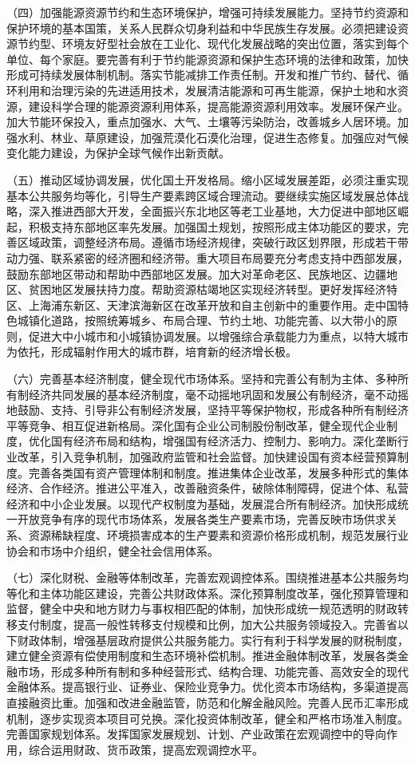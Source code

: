 （四）加强能源资源节约和生态环境保护，增强可持续发展能力。坚持节约资源和保护环境的基本国策，关系人民群众切身利益和中华民族生存发展。必须把建设资源节约型、环境友好型社会放在工业化、现代化发展战略的突出位置，落实到每个单位、每个家庭。要完善有利于节约能源资源和保护生态环境的法律和政策，加快形成可持续发展体制机制。落实节能减排工作责任制。开发和推广节约、替代、循环利用和治理污染的先进适用技术，发展清洁能源和可再生能源，保护土地和水资源，建设科学合理的能源资源利用体系，提高能源资源利用效率。发展环保产业。加大节能环保投入，重点加强水、大气、土壤等污染防治，改善城乡人居环境。加强水利、林业、草原建设，加强荒漠化石漠化治理，促进生态修复。加强应对气候变化能力建设，为保护全球气候作出新贡献。

（五）推动区域协调发展，优化国土开发格局。缩小区域发展差距，必须注重实现基本公共服务均等化，引导生产要素跨区域合理流动。要继续实施区域发展总体战略，深入推进西部大开发，全面振兴东北地区等老工业基地，大力促进中部地区崛起，积极支持东部地区率先发展。加强国土规划，按照形成主体功能区的要求，完善区域政策，调整经济布局。遵循市场经济规律，突破行政区划界限，形成若干带动力强、联系紧密的经济圈和经济带。重大项目布局要充分考虑支持中西部发展，鼓励东部地区带动和帮助中西部地区发展。加大对革命老区、民族地区、边疆地区、贫困地区发展扶持力度。帮助资源枯竭地区实现经济转型。更好发挥经济特区、上海浦东新区、天津滨海新区在改革开放和自主创新中的重要作用。走中国特色城镇化道路，按照统筹城乡、布局合理、节约土地、功能完善、以大带小的原则，促进大中小城市和小城镇协调发展。以增强综合承载能力为重点，以特大城市为依托，形成辐射作用大的城市群，培育新的经济增长极。

（六）完善基本经济制度，健全现代市场体系。坚持和完善公有制为主体、多种所有制经济共同发展的基本经济制度，毫不动摇地巩固和发展公有制经济，毫不动摇地鼓励、支持、引导非公有制经济发展，坚持平等保护物权，形成各种所有制经济平等竞争、相互促进新格局。深化国有企业公司制股份制改革，健全现代企业制度，优化国有经济布局和结构，增强国有经济活力、控制力、影响力。深化垄断行业改革，引入竞争机制，加强政府监管和社会监督。加快建设国有资本经营预算制度。完善各类国有资产管理体制和制度。推进集体企业改革，发展多种形式的集体经济、合作经济。推进公平准入，改善融资条件，破除体制障碍，促进个体、私营经济和中小企业发展。以现代产权制度为基础，发展混合所有制经济。加快形成统一开放竞争有序的现代市场体系，发展各类生产要素市场，完善反映市场供求关系、资源稀缺程度、环境损害成本的生产要素和资源价格形成机制，规范发展行业协会和市场中介组织，健全社会信用体系。

（七）深化财税、金融等体制改革，完善宏观调控体系。围绕推进基本公共服务均等化和主体功能区建设，完善公共财政体系。深化预算制度改革，强化预算管理和监督，健全中央和地方财力与事权相匹配的体制，加快形成统一规范透明的财政转移支付制度，提高一般性转移支付规模和比例，加大公共服务领域投入。完善省以下财政体制，增强基层政府提供公共服务能力。实行有利于科学发展的财税制度，建立健全资源有偿使用制度和生态环境补偿机制。推进金融体制改革，发展各类金融市场，形成多种所有制和多种经营形式、结构合理、功能完善、高效安全的现代金融体系。提高银行业、证券业、保险业竞争力。优化资本市场结构，多渠道提高直接融资比重。加强和改进金融监管，防范和化解金融风险。完善人民币汇率形成机制，逐步实现资本项目可兑换。深化投资体制改革，健全和严格市场准入制度。完善国家规划体系。发挥国家发展规划、计划、产业政策在宏观调控中的导向作用，综合运用财政、货币政策，提高宏观调控水平。

